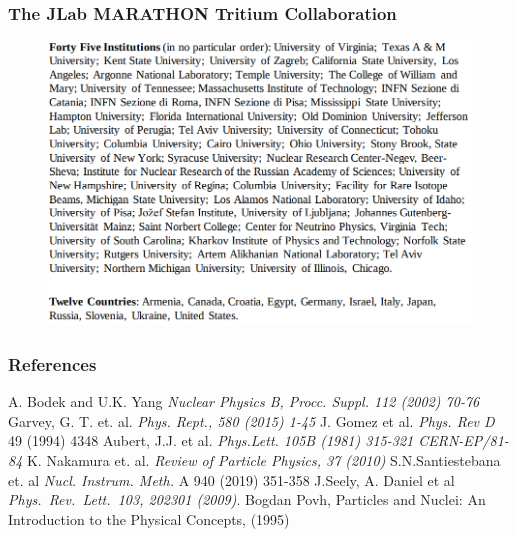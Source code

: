 \documentclass[12pt,usenames,dvipsnames]{beamer}
\begin{document}
\begin{frame}
\frametitle{The JLab MARATHON Tritium Collaboration}
\vspace{-15pt}

\begin{figure}
\includegraphics[width =11.5cm]{../images/callabos_un.png}
\end{figure}

\end{frame}


\begin{frame}[allowframebreaks]
\vspace*{-3pt}
\frametitle{References}
\footnotesize{
	\begin{thebibliography}{9} %
		\vspace*{-20pt}
		 A. Bodek and U.K. Yang
		\newblock \emph{Nuclear Physics B, Procc. Suppl. 112 (2002) 70-76 }			
\vspace*{-8pt}
		 Garvey, G. T. et. al.
		\newblock \emph{Phys. Rept., 580 (2015) 1-45 }	
\vspace*{-8pt}		
		 J. Gomez et al.   
		\newblock \emph{Phys. Rev D}  49 (1994) 4348 
\vspace*{-8pt}
		 Aubert, J.J. et al.
		\newblock \emph{Phys.Lett. 105B (1981) 315-321 CERN-EP/81-84}
\vspace*{-8pt}		
		 K. Nakamura et. al.
		\newblock \emph{Review of Particle Physics, 37 (2010) }	
\vspace*{-8pt}		
		 S.N.Santiestebana et. al 
		\newblock 	\emph{Nucl. Instrum. Meth.} A 940 (2019) 351-358
\vspace*{-8pt}				
		 J.Seely, A. Daniel et al  
		\newblock \emph{Phys.\ Rev.\ Lett.\   103, 202301 (2009)}.
\vspace*{-8pt}				
		 Bogdan Povh,
		\newblock Particles and Nuclei: An Introduction to the Physical Concepts, (1995)
	
		
	\end{thebibliography}
}
\end{frame}
\end{document}
